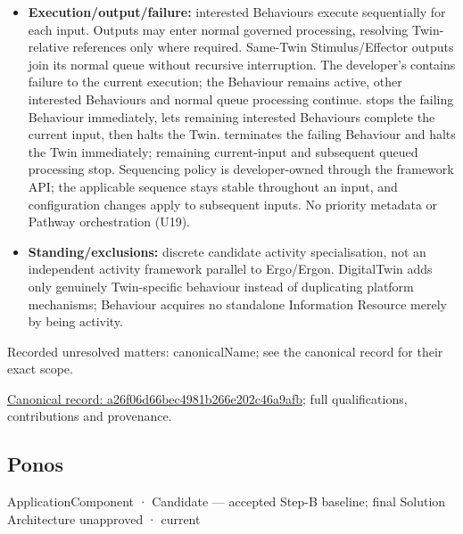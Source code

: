 \begin{itemize}
\item \textbf{Execution/output/failure:} interested Behaviours execute sequentially for
  each input. Outputs may enter normal governed processing, resolving Twin-relative
  references only where required. Same-Twin Stimulus/Effector outputs join its
  normal queue without recursive interruption. The developer's
  \texttt{} contains failure to the current execution; the
  Behaviour remains active, other interested Behaviours and normal queue processing
  continue. \texttt{} stops the failing Behaviour immediately,
  lets remaining interested Behaviours complete the current input, then halts
  the Twin. \texttt{} terminates the failing Behaviour and halts
  the Twin immediately; remaining current-input and subsequent queued processing
  stop. Sequencing policy is developer-owned through the framework API; the
  applicable sequence stays stable throughout an input, and configuration changes
  apply to subsequent inputs. No priority metadata or Pathway orchestration (U19).

\item \textbf{Standing/exclusions:} discrete candidate activity specialisation, not an
  independent activity framework parallel to Ergo/Ergon. DigitalTwin adds only
  genuinely Twin-specific behaviour instead of duplicating platform mechanisms;
  Behaviour acquires no standalone Information Resource merely by being activity.

\end{itemize}

{\small Recorded unresolved matters: canonicalName; see the canonical record for their exact scope.}\par
{\footnotesize \href{../../../../continuum/application/application-component/a26f06d66bec4981b266e202c46a9afb.md}{Canonical record: a26f06d66bec4981b266e202c46a9afb}; full qualifications, contributions and provenance.}\par
\subsection{Ponos}

\label{element:b521762c1ea444b48cd5f66be3752d30}
{\small ApplicationComponent · Candidate — accepted Step-B baseline; final Solution Architecture unapproved · current}\par

